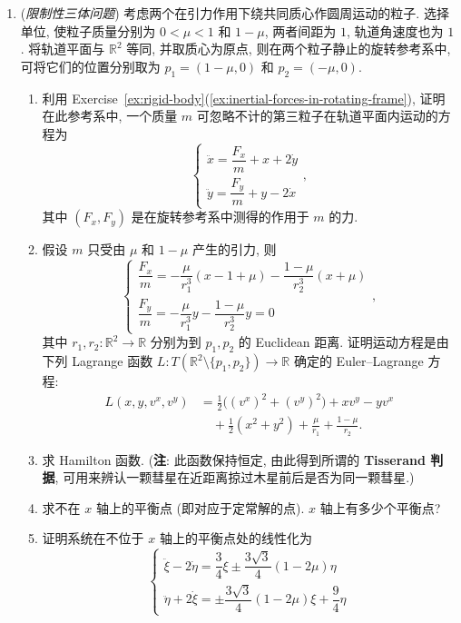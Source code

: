 \begin{RiemannExercise}
\begin{enumerate}[label=(\arabic*),ref=\arabic*,leftmargin=*]
\begin{enumerate}[label=(\alph*),leftmargin=*]
\item 写出 Hamilton 函数的表达式, 并利用运动方程验证它沿任意运动保持恒定.
\end{enumerate}
\item\label{ex:restricted-three-body-problem}
(\emph{限制性三体问题}) 考虑两个在引力作用下绕共同质心作圆周运动的粒子. 选择单位, 使粒子质量分别为 $0<\mu<1$ 和 $1-\mu$, 两者间距为 $1$, 轨道角速度也为 $1$. 将轨道平面与 $\mathbb{R}^2$ 等同, 并取质心为原点, 则在两个粒子静止的旋转参考系中, 可将它们的位置分别取为 $p_1=(1-\mu,0)$ 和 $p_2=(-\mu,0)$.
\begin{enumerate}[label=(\alph*),leftmargin=*]
\item 利用 Exercise~\ref{ex:rigid-body}(\ref{ex:inertial-forces-in-rotating-frame}), 证明在此参考系中, 一个质量 $m$ 可忽略不计的第三粒子在轨道平面内运动的方程为
\[
  \begin{cases}
    \ddot x=\dfrac{F_x}{m}+x+2\dot y\\[.5ex]
    \ddot y=\dfrac{F_y}{m}+y-2\dot x
  \end{cases},
\]
其中 $(F_x,F_y)$ 是在旋转参考系中测得的作用于 $m$ 的力.
\item 假设 $m$ 只受由 $\mu$ 和 $1-\mu$ 产生的引力, 则
\[
  \begin{cases}
    \dfrac{F_x}{m}=-\dfrac{\mu}{r_1^3}(x-1+\mu)-\dfrac{1-\mu}{r_2^3}(x+\mu)\\[.5ex]
    \dfrac{F_y}{m}=-\dfrac{\mu}{r_1^3}y-\dfrac{1-\mu}{r_2^3}y=0
  \end{cases},
\]
其中 $r_1,r_2:\mathbb{R}^2\to\mathbb{R}$ 分别为到 $p_1,p_2$ 的 Euclidean 距离. 证明运动方程是由下列 Lagrange 函数 $L:T(\mathbb{R}^2\setminus\{p_1,p_2\})\to\mathbb{R}$ 确定的 Euler–Lagrange 方程:
\begin{align*}
  L(x,y,v^x,v^y)
  &=\frac{1}{2}\bigl((v^x)^2+(v^y)^2\bigr)+xv^y-yv^x\\
  &\quad+\frac{1}{2}(x^2+y^2)+\frac{\mu}{r_1}+\frac{1-\mu}{r_2}.
\end{align*}
\item 求 Hamilton 函数. (\textbf{注}: 此函数保持恒定, 由此得到所谓的 \textbf{Tisserand 判据}, 可用来辨认一颗彗星在近距离掠过木星前后是否为同一颗彗星.)
\item 求不在 $x$ 轴上的平衡点 (即对应于定常解的点). $x$ 轴上有多少个平衡点?
\item 证明系统在不位于 $x$ 轴上的平衡点处的线性化为
\[
  \begin{cases}
    \ddot\xi-2\dot\eta=\dfrac{3}{4}\xi\pm\dfrac{3\sqrt{3}}{4}(1-2\mu)\eta\\[.5ex]
    \ddot\eta+2\dot\xi=\pm\dfrac{3\sqrt{3}}{4}(1-2\mu)\xi+\dfrac{9}{4}\eta

\end{cases}\]
\end{enumerate}
\end{enumerate}
\end{RiemannExercise}
